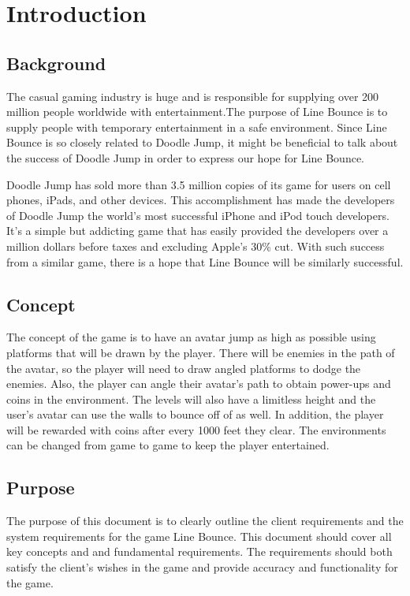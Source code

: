 \chapter{Introduction}
\section{Background }

The casual gaming industry is huge and is responsible for supplying
over 200 million people worldwide with entertainment.The purpose of
Line Bounce is to supply people with temporary entertainment in a
safe environment. Since Line Bounce is so closely related to Doodle
Jump, it might be beneficial to talk about the success of Doodle Jump
in order to express our hope for Line Bounce.

Doodle Jump has sold more than 3.5 million copies of its game for
users on cell phones, iPads, and other devices. This accomplishment
has made the developers of Doodle Jump the world\textquoteright{}s
most successful iPhone and iPod touch developers. It\textquoteright{}s
a simple but addicting game that has easily provided the developers
over a million dollars before taxes and excluding Apple\textquoteright{}s
30\% cut. With such success from a similar game, there is a hope that
Line Bounce will be similarly successful.


\section{Concept}

The concept of the game is to have an avatar jump as high as possible
using platforms that will be drawn by the player. There will be enemies
in the path of the avatar, so the player will need to draw angled
platforms to dodge the enemies. Also, the player can angle their avatar\textquoteright{}s
path to obtain power-ups and coins in the environment. The levels
will also have a limitless height and the user\textquoteright{}s avatar
can use the walls to bounce off of as well. In addition, the player
will be rewarded with coins after every 1000 feet they clear. The
environments can be changed from game to game to keep the player entertained. 


\section{Purpose}

The purpose of this document is to clearly outline the client requirements
and the system requirements for the game Line Bounce. This document
should cover all key concepts and and fundamental requirements. The
requirements should both satisfy the client\textquoteright{}s wishes
in the game and provide accuracy and functionality for the game.


